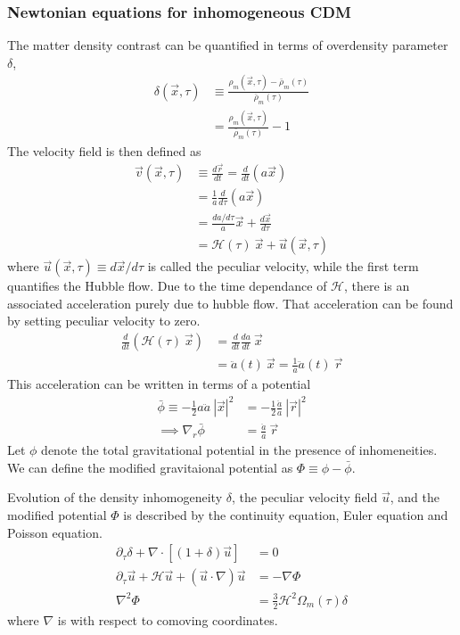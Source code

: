 \documentclass[12pt,twocolumn]{article}
\begin{document}
\subsubsection{Newtonian equations for inhomogeneous CDM}
The matter density contrast can be quantified in terms of overdensity parameter $\delta$,
\begin{align}
\nonumber
\delta (\vec{x}, \tau) &\equiv \frac{{\rho}_{m} (\vec{x}, \tau) -\bar{\rho}_{m} (\tau) }{\bar{\rho}_{m} (\tau)} \\
&= \frac{{\rho}_{m} (\vec{x}, \tau) }{\bar{\rho}_{m} (\tau)} - 1
\end{align}
The velocity field is then defined as
\begin{align}
\vec{v} (\vec{x}, \tau) &\equiv \frac{d \vec{r}}{dt} = \frac{d }{dt} (a \vec{x})\\
&= \frac{1}{a} \frac{d }{d \tau} (a \vec{x})\\
&= \frac{da/d \tau}{a} \vec{x} + \frac{d \vec{x}}{d \tau}\\
&= \mathcal{H} (\tau) ~\vec{x} + \vec{u} (\vec{x}, \tau)
\end{align}
where $\vec{u} (\vec{x}, \tau) \equiv d \vec{x} / d\tau$ is called the peculiar velocity, while the first term quantifies the Hubble flow. Due to the time dependance of $\mathcal{H}$, there is an associated acceleration purely due to hubble flow. That acceleration can be found by setting peculiar velocity to zero. 
\begin{align}
\frac{d}{dt} \left( \mathcal{H} (\tau) ~\vec{x} \right) &= \frac{d}{dt} \frac{da}{dt}  ~\vec{x}\\
&= \ddot{a}(t) ~\vec{x} = \frac{1}{a} \ddot{a}(t) ~\vec{r}
\end{align}
This acceleration can be written in terms of a potential
\begin{align}
\bar{\phi} \equiv - \frac{1}{2} a \ddot{a} ~\left| \vec{x}\right| ^2 &= - \frac{1}{2} \frac{\ddot{a}}{a} ~\left| \vec{r}\right| ^2\\
\implies \nabla_{r} \bar{\phi} &= \frac{\ddot{a}}{a} ~\vec{r}
\end{align}
Let $\phi$ denote the total gravitational potential in the presence of inhomeneities. We can define the modified gravitaional potential as $\Phi \equiv \phi - \bar{\phi}$.

Evolution of the density inhomogeneity $\delta$, the peculiar velocity field  $\vec{u}$, and the modified potential $\Phi$ is described by the continuity equation, Euler equation and Poisson equation.
\begin{align}
\partial_{\tau} \delta + \nabla \cdot \left[ (1+ \delta) \vec{u} \right] &= 0\\
\partial_{\tau} \vec{u} + \mathcal{H} \vec{u} + \left( \vec{u} \cdot \nabla \right)  \vec{u} &= - \nabla \Phi\\
\nabla^2 \Phi &= \frac{3}{2} \mathcal{H}^2 \Omega_{m}(\tau) \delta
\end{align}
where $\nabla$ is with respect to comoving coordinates.
\end{document}
